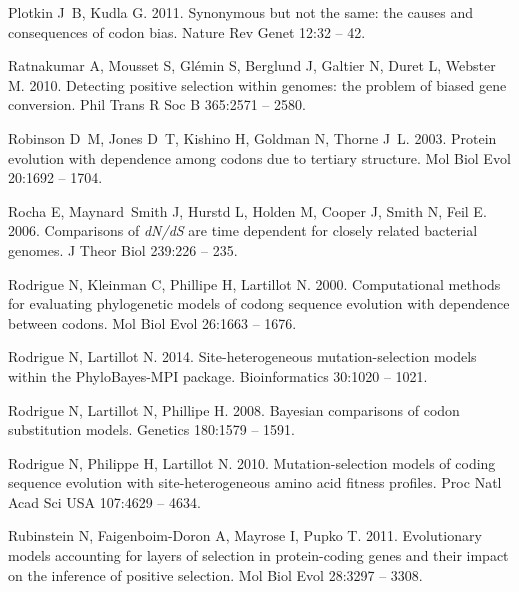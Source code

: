\documentclass[11pt]{article}
\begin{document}
\begin{thebibliography}{79}
Plotkin J~B, Kudla G. 2011.
\newblock Synonymous but not the same: the causes and consequences of codon
  bias.
\newblock Nature Rev Genet 12:32 -- 42.

Ratnakumar A, Mousset S, Gl\'{e}min S, Berglund J, Galtier N, Duret L, Webster
  M. 2010.
\newblock Detecting positive selection within genomes: the problem of biased
  gene conversion.
\newblock Phil Trans R Soc B 365:2571 -- 2580.

Robinson D~M, Jones D~T, Kishino H, Goldman N, Thorne J~L. 2003.
\newblock Protein evolution with dependence among codons due to tertiary
  structure.
\newblock Mol Biol Evol 20:1692 -- 1704.

Rocha E, Maynard~Smith J, Hurstd L, Holden M, Cooper J, Smith N, Feil E. 2006.
\newblock Comparisons of \emph{dN/dS} are time dependent for closely related
  bacterial genomes.
\newblock J Theor Biol 239:226 -- 235.

Rodrigue N, Kleinman C, Phillipe H, Lartillot N. 2000.
\newblock Computational methods for evaluating phylogenetic models of codong
  sequence evolution with dependence between codons.
\newblock Mol Biol Evol 26:1663 -- 1676.

Rodrigue N, Lartillot N. 2014.
\newblock Site-heterogeneous mutation-selection models within the
  {PhyloBayes-MPI} package.
\newblock Bioinformatics 30:1020 -- 1021.

Rodrigue N, Lartillot N, Phillipe H. 2008.
\newblock Bayesian comparisons of codon substitution models.
\newblock Genetics 180:1579 -- 1591.

Rodrigue N, Philippe H, Lartillot N. 2010.
\newblock Mutation-selection models of coding sequence evolution with
  site-heterogeneous amino acid fitness profiles.
\newblock Proc Natl Acad Sci USA 107:4629 -- 4634.

Rubinstein N, Faigenboim-Doron A, Mayrose I, Pupko T. 2011.
\newblock Evolutionary models accounting for layers of selection in
  protein-coding genes and their impact on the inference of positive selection.
\newblock Mol Biol Evol 28:3297 -- 3308.


\end{thebibliography}
\end{document}
